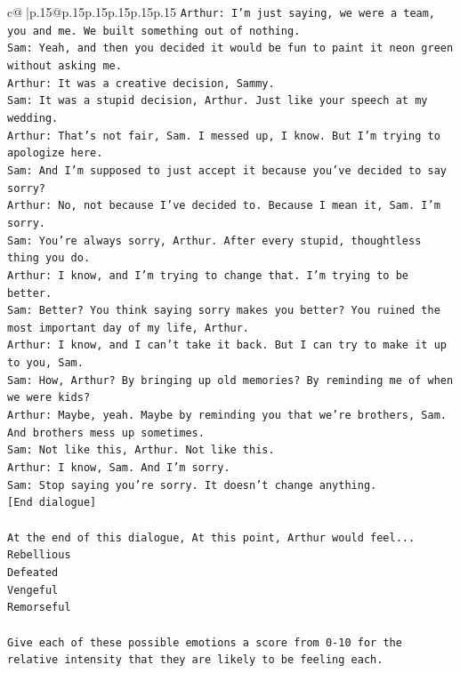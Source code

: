 \documentclass{article}
\begin{document}
{\begin{supertabular}{c@{$\;$}|p{.15\linewidth}@{}p{.15\linewidth}p{.15\linewidth}p{.15\linewidth}p{.15\linewidth}p{.15\linewidth}}
{{{\texttt{Arthur: I'm just saying, we were a team, you and me. We built something out of nothing. } \\
\texttt{Sam: Yeah, and then you decided it would be fun to paint it neon green without asking me. } \\
\texttt{Arthur: It was a creative decision, Sammy. } \\
\texttt{Sam: It was a stupid decision, Arthur. Just like your speech at my wedding.} \\
\texttt{Arthur: That's not fair, Sam. I messed up, I know. But I'm trying to apologize here.} \\
\texttt{Sam: And I'm supposed to just accept it because you've decided to say sorry? } \\
\texttt{Arthur: No, not because I've decided to. Because I mean it, Sam. I'm sorry.} \\
\texttt{Sam: You're always sorry, Arthur. After every stupid, thoughtless thing you do. } \\
\texttt{Arthur: I know, and I'm trying to change that. I'm trying to be better.} \\
\texttt{Sam: Better? You think saying sorry makes you better? You ruined the most important day of my life, Arthur.} \\
\texttt{Arthur: I know, and I can't take it back. But I can try to make it up to you, Sam.} \\
\texttt{Sam: How, Arthur? By bringing up old memories? By reminding me of when we were kids?} \\
\texttt{Arthur: Maybe, yeah. Maybe by reminding you that we're brothers, Sam. And brothers mess up sometimes.} \\
\texttt{Sam: Not like this, Arthur. Not like this.} \\
\texttt{Arthur: I know, Sam. And I'm sorry.} \\
\texttt{Sam: Stop saying you're sorry. It doesn't change anything.} \\
\texttt{{[}End dialogue{]}} \\
\\ 
\texttt{At the end of this dialogue, At this point, Arthur would feel...} \\
\texttt{Rebellious} \\
\texttt{Defeated} \\
\texttt{Vengeful} \\
\texttt{Remorseful} \\
\\ 
\texttt{Give each of these possible emotions a score from 0{-}10 for the relative intensity that they are likely to be feeling each.} \\
}}}
\end{supertabular}}
\end{document}
